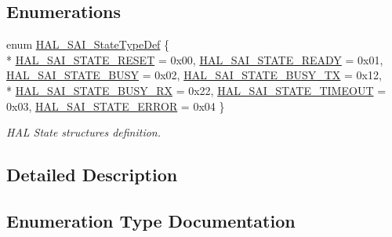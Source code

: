 \subsection*{Enumerations}
\begin{DoxyCompactItemize}
\item 
enum \hyperlink{group___s_a_i___exported___types_gac758df9679f0ee29c77d9b1b66289589}{H\+A\+L\+\_\+\+S\+A\+I\+\_\+\+State\+Type\+Def} \{ \\*
\hyperlink{group___s_a_i___exported___types_ggac758df9679f0ee29c77d9b1b66289589a4c5621e3b54c74b9f1f1ddfb1258c40d}{H\+A\+L\+\_\+\+S\+A\+I\+\_\+\+S\+T\+A\+T\+E\+\_\+\+R\+E\+S\+ET} = 0x00, 
\hyperlink{group___s_a_i___exported___types_ggac758df9679f0ee29c77d9b1b66289589a8de59234b4720889ae8fa4aeb28a6b4e}{H\+A\+L\+\_\+\+S\+A\+I\+\_\+\+S\+T\+A\+T\+E\+\_\+\+R\+E\+A\+DY} = 0x01, 
\hyperlink{group___s_a_i___exported___types_ggac758df9679f0ee29c77d9b1b66289589a928fb4c37550010f00337dd322c3f175}{H\+A\+L\+\_\+\+S\+A\+I\+\_\+\+S\+T\+A\+T\+E\+\_\+\+B\+U\+SY} = 0x02, 
\hyperlink{group___s_a_i___exported___types_ggac758df9679f0ee29c77d9b1b66289589ab623d0aff2f6a3e19b16f7c9f653ab76}{H\+A\+L\+\_\+\+S\+A\+I\+\_\+\+S\+T\+A\+T\+E\+\_\+\+B\+U\+S\+Y\+\_\+\+TX} = 0x12, 
\\*
\hyperlink{group___s_a_i___exported___types_ggac758df9679f0ee29c77d9b1b66289589a6fc14215037d314e6a566ca8d7d29ee1}{H\+A\+L\+\_\+\+S\+A\+I\+\_\+\+S\+T\+A\+T\+E\+\_\+\+B\+U\+S\+Y\+\_\+\+RX} = 0x22, 
\hyperlink{group___s_a_i___exported___types_ggac758df9679f0ee29c77d9b1b66289589a25a17e98ee2719a10a767fd366adf167}{H\+A\+L\+\_\+\+S\+A\+I\+\_\+\+S\+T\+A\+T\+E\+\_\+\+T\+I\+M\+E\+O\+UT} = 0x03, 
\hyperlink{group___s_a_i___exported___types_ggac758df9679f0ee29c77d9b1b66289589a32aa6b5d758a628a454701a063fd7b7a}{H\+A\+L\+\_\+\+S\+A\+I\+\_\+\+S\+T\+A\+T\+E\+\_\+\+E\+R\+R\+OR} = 0x04
 \}\begin{DoxyCompactList}\small\item\em H\+AL State structures definition. \end{DoxyCompactList}
\end{DoxyCompactItemize}


\subsection{Detailed Description}


\subsection{Enumeration Type Documentation}
